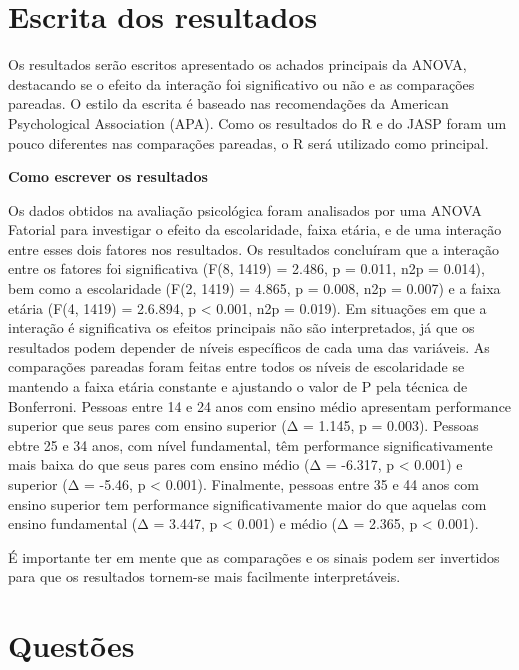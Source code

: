 \documentclass[
]{book}
\begin{document}
\hypertarget{escrita-dos-resultados-8}{%
\section{Escrita dos resultados}\label{escrita-dos-resultados-8}}

Os resultados serão escritos apresentado os achados principais da ANOVA,
destacando se o efeito da interação foi significativo ou não e as
comparações pareadas. O estilo da escrita é baseado nas recomendações da
American Psychological Association (APA). Como os resultados do R e do
JASP foram um pouco diferentes nas comparações pareadas, o R será
utilizado como principal.

\begin{writing}
\textbf{Como escrever os resultados}

Os dados obtidos na avaliação psicológica foram analisados por uma ANOVA
Fatorial para investigar o efeito da escolaridade, faixa etária, e de
uma interação entre esses dois fatores nos resultados. Os resultados
concluíram que a interação entre os fatores foi significativa (F(8,
1419) = 2.486, p = 0.011, n2p = 0.014), bem como a escolaridade (F(2,
1419) = 4.865, p = 0.008, n2p = 0.007) e a faixa etária (F(4, 1419) =
2.6.894, p \textless{} 0.001, n2p = 0.019). Em situações em que a
interação é significativa os efeitos principais não são interpretados,
já que os resultados podem depender de níveis específicos de cada uma
das variáveis. As comparações pareadas foram feitas entre todos os
níveis de escolaridade se mantendo a faixa etária constante e ajustando
o valor de P pela técnica de Bonferroni. Pessoas entre 14 e 24 anos com
ensino médio apresentam performance superior que seus pares com ensino
superior (Δ = 1.145, p = 0.003). Pessoas ebtre 25 e 34 anos, com nível
fundamental, têm performance significativamente mais baixa do que seus
pares com ensino médio (Δ = -6.317, p \textless{} 0.001) e superior (Δ =
-5.46, p \textless{} 0.001). Finalmente, pessoas entre 35 e 44 anos com
ensino superior tem performance significativamente maior do que aquelas
com ensino fundamental (Δ = 3.447, p \textless{} 0.001) e médio (Δ =
2.365, p \textless{} 0.001).
\end{writing}

É importante ter em mente que as comparações e os sinais podem ser
invertidos para que os resultados tornem-se mais facilmente
interpretáveis.

\hypertarget{questuxf5es-4}{%
\section{Questões}\label{questuxf5es-4}}
\end{document}
